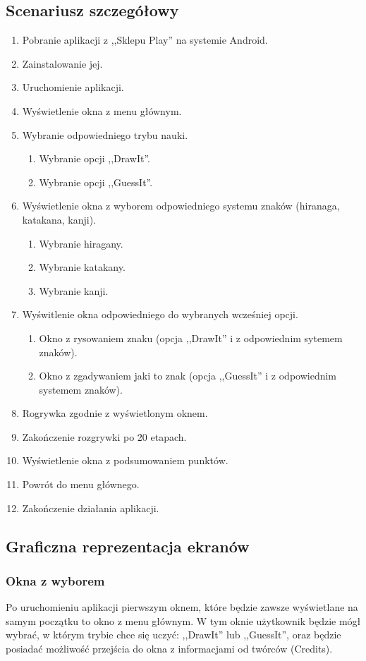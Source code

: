 \documentclass[15pt]{article}
\begin{document}
\subsection{Scenariusz szczegółowy}
\begin{enumerate}
\item Pobranie aplikacji z ,,Sklepu Play'' na systemie Android.
\item Zainstalowanie jej.
\item Uruchomienie aplikacji.
\item Wyświetlenie okna z menu głównym.
\item Wybranie odpowiedniego trybu nauki.
\begin{enumerate}
  \item Wybranie opcji ,,DrawIt''.
  \item Wybranie opcji ,,GuessIt''.
\end{enumerate}
\item Wyświetlenie okna z wyborem odpowiedniego systemu znaków (hiranaga, katakana, kanji).
\begin{enumerate}
  \item Wybranie hiragany.
  \item Wybranie katakany.
  \item Wybranie kanji.
\end{enumerate}
\item Wyświtlenie okna odpowiedniego do wybranych wcześniej opcji.
\begin{enumerate}
  \item Okno z rysowaniem znaku (opcja ,,DrawIt'' i z odpowiednim sytemem znaków).
  \item Okno z zgadywaniem jaki to znak (opcja ,,GuessIt'' i z odpowiednim systemem znaków).
\end{enumerate}
\item Rogrywka zgodnie z wyświetlonym oknem. 
\item Zakończenie rozgrywki po 20 etapach.
\item Wyświetlenie okna z podsumowaniem punktów.
\item Powrót do menu głównego.
\item Zakończenie działania aplikacji.
\end{enumerate}
\newpage
\subsection{Graficzna reprezentacja ekranów}
\subsubsection{Okna z wyborem}
Po uruchomieniu aplikacji pierwszym oknem, które będzie zawsze wyświetlane na samym początku to okno z menu głównym.
W tym oknie użytkownik będzie mógł wybrać, w którym trybie chce się uczyć: ,,DrawIt'' lub ,,GuessIt'', oraz będzie posiadać możliwość przejścia do okna z informacjami od twórców (Credits).
\end{document}
